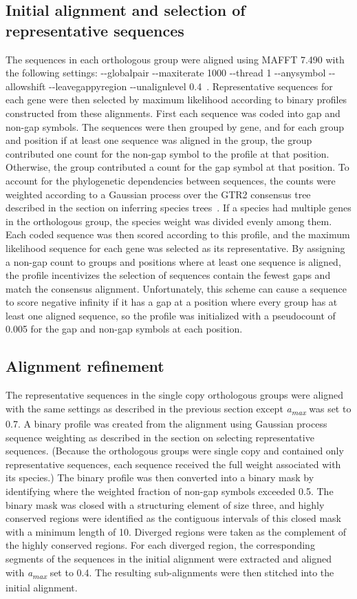 \subsection*{Initial alignment and selection of representative sequences}
The sequences in each orthologous group were aligned using MAFFT 7.490 with the following settings: -{}-globalpair -{}-maxiterate 1000 -{}-thread 1 -{}-anysymbol -{}-allowshift -{}-leavegappyregion -{}-unalignlevel 0.4~\cite{Katoh2013}. Representative sequences for each gene were then selected by maximum likelihood according to binary profiles constructed from these alignments. First each sequence was coded into gap and non-gap symbols. The sequences were then grouped by gene, and for each group and position if at least one sequence was aligned in the group, the group contributed one count for the non-gap symbol to the profile at that position. Otherwise, the group contributed a count for the gap symbol at that position. To account for the phylogenetic dependencies between sequences, the counts were weighted according to a Gaussian process over the GTR2 consensus tree described in the section on inferring species trees~\cite{Altschul1989}. If a species had multiple genes in the orthologous group, the species weight was divided evenly among them. Each coded sequence was then scored according to this profile, and the maximum likelihood sequence for each gene was selected as its representative. By assigning a non-gap count to groups and positions where at least one sequence is aligned, the profile incentivizes the selection of sequences contain the fewest gaps and match the consensus alignment. Unfortunately, this scheme can cause a sequence to score negative infinity if it has a gap at a position where every group has at least one aligned sequence, so the profile was initialized with a pseudocount of 0.005 for the gap and non-gap symbols at each position.

\subsection*{Alignment refinement}
The representative sequences in the single copy orthologous groups were aligned with the same settings as described in the previous section except \textit{a\textsubscript{max}} was set to 0.7. A binary profile was created from the alignment using Gaussian process sequence weighting as described in the section on selecting representative sequences. (Because the orthologous groups were single copy and contained only representative sequences, each sequence received the full weight associated with its species.) The binary profile was then converted into a binary mask by identifying where the weighted fraction of non-gap symbols exceeded 0.5. The binary mask was closed with a structuring element of size three, and highly conserved regions were identified as the contiguous intervals of this closed mask with a minimum length of 10. Diverged regions were taken as the complement of the highly conserved regions. For each diverged region, the corresponding segments of the sequences in the initial alignment were extracted and aligned with \textit{a\textsubscript{max}} set to 0.4. The resulting sub-alignments were then stitched into the initial alignment.

